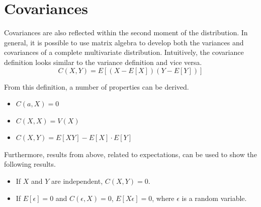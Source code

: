 \documentclass[]{amsart}
\begin{document}
\section{Covariances}
Covariances are also reflected within the second moment of the
distribution. In general, it is possible to use matrix algebra to
develop both the variances and covariances of a complete multivariate
distribution. Intuitively, the covariance definition looks similar to
the variance definition and vice versa.
\begin{equation}\label{cov}
C(X,Y) = E\left[(X-E[X])(Y-E[Y])\right]
\end{equation}

From this definition, a number of properties can be derived.
\begin{itemize}
\item $C(a,X) = 0$
\item $C(X,X) = V(X)$
\item $C(X,Y)=E[XY]-E[X]\cdot E[Y]$
\end{itemize}

Furthermore, results from above, related to expectations, can be used to
show the following results.
\begin{itemize}
\item If $X$ and $Y$ are independent, $C(X,Y)=0$.
\item If $E[\epsilon] = 0$ and $C(\epsilon,X) = 0$, $E[X\epsilon]=0$,
  where $\epsilon$ is a random variable.
\end{itemize}
\end{document}
